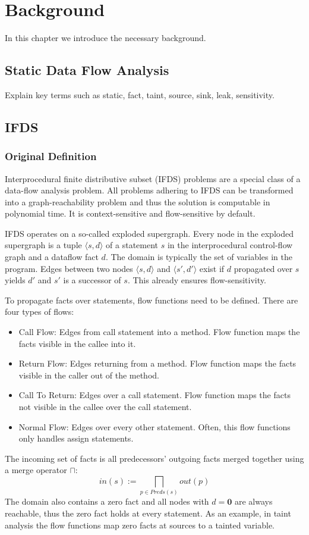 \documentclass[../draft.tex]{subfiles}
\begin{document}
    \chapter{Background}
    In this chapter we introduce the necessary background.

    \section{Static Data Flow Analysis}
    Explain key terms such as static, fact, taint, source, sink, leak, sensitivity.
    
    \section{IFDS}
    \subsection{Original Definition}
    Interprocedural finite distributive subset (IFDS) problems are a special class of a data-flow analysis problem. All problems adhering to IFDS can be transformed into a graph-reachability problem and thus the solution is computable in polynomial time. It is context-sensitive and flow-sensitive by default.

    IFDS operates on a so-called exploded supergraph. Every node in the exploded supergraph is a tuple $\langle s, d \rangle$ of a statement $s$ in the interprocedural control-flow graph and a dataflow fact $d$. The domain is typically the set of variables in the program. Edges between two nodes $\langle s, d \rangle$ and $\langle s', d' \rangle$ exist if $d$ propagated over $s$ yields $d'$ and $s'$ is a successor of $s$. This already ensures flow-sensitivity.

    To propagate facts over statements, flow functions need to be defined. There are four types of flows:
    \begin{itemize}
        \item Call Flow: Edges from call statement into a method. Flow function maps the facts visible in the callee into it. 
        \item Return Flow: Edges returning from a method. Flow function maps the facts visible in the caller out of the method.
        \item Call To Return: Edges over a call statement. Flow function maps the facts not visible in the callee over the call statement.
        \item Normal Flow: Edges over every other statement. Often, this flow functions only handles assign statements.
    \end{itemize}
    The incoming set of facts is all predecessors' outgoing facts merged together using a merge operator $\sqcap$: 
    $$in(s) := \bigsqcap_{p \in Preds(s)} out(p)$$
    The domain also contains a zero fact and all nodes with $d=\textbf{0}$ are always reachable, thus the zero fact holds at every statement. As an example, in taint analysis the flow functions map zero facts at sources to a tainted variable. 
\end{document}
